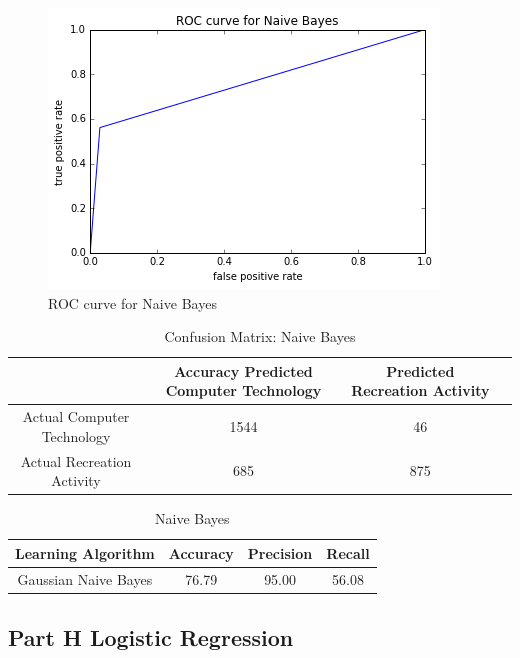 \documentclass[11pt]{article}
\begin{document}
\begin{figure}[H]
	
	\includegraphics[width=\textwidth]{ROC_NaiveBayes.png}
	\caption{ROC curve for Naive Bayes}
\end{figure}

\begin{table}[h]
	\centering
	\begin{tabular}{|c|c|c|c|} \hline
		& Accuracy 		Predicted Computer Technology & Predicted Recreation Activity \\ \hline
		Actual Computer Technology & 1544 & 46 \\
		Actual Recreation Activity & 685& 875  \\
		\hline
	\end{tabular}
	\caption{Confusion Matrix: Naive Bayes}
	\label{table:ovr_res}
\end{table}

\begin{table}[h]
	\centering
	\begin{tabular}{|c|c|c|c|} \hline
		Learning Algorithm & Accuracy & Precision & Recall\\ \hline
		Gaussian Naive Bayes& 76.79 & 95.00 & 56.08 \\
		\hline
	\end{tabular}
	\caption{Naive Bayes}
	\label{table:ovr_res}
\end{table}

\subsection{Part H Logistic Regression}
\end{document}
